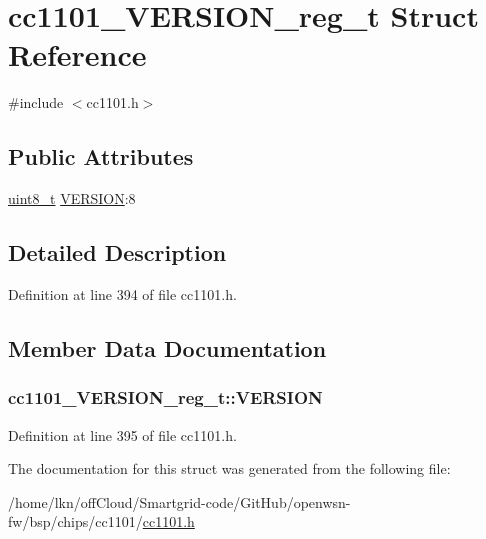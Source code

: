 \hypertarget{structcc1101___v_e_r_s_i_o_n__reg__t}{}\section{cc1101\+\_\+\+V\+E\+R\+S\+I\+O\+N\+\_\+reg\+\_\+t Struct Reference}
\label{structcc1101___v_e_r_s_i_o_n__reg__t}


{\ttfamily \#include $<$cc1101.\+h$>$}

\subsection*{Public Attributes}
\begin{DoxyCompactItemize}
\item 
\hyperlink{_p_e___types_8h_aba7bc1797add20fe3efdf37ced1182c5}{uint8\+\_\+t} \hyperlink{structcc1101___v_e_r_s_i_o_n__reg__t_a79ddae599fc33769e9c439d73ef1a0eb}{V\+E\+R\+S\+I\+ON}\+:8
\end{DoxyCompactItemize}


\subsection{Detailed Description}


Definition at line 394 of file cc1101.\+h.



\subsection{Member Data Documentation}
\subsubsection[{\texorpdfstring{V\+E\+R\+S\+I\+ON}{VERSION}}]{ cc1101\+\_\+\+V\+E\+R\+S\+I\+O\+N\+\_\+reg\+\_\+t\+::\+V\+E\+R\+S\+I\+ON}\hypertarget{structcc1101___v_e_r_s_i_o_n__reg__t_a79ddae599fc33769e9c439d73ef1a0eb}{}\label{structcc1101___v_e_r_s_i_o_n__reg__t_a79ddae599fc33769e9c439d73ef1a0eb}


Definition at line 395 of file cc1101.\+h.



The documentation for this struct was generated from the following file\+:\begin{DoxyCompactItemize}
\item 
/home/lkn/off\+Cloud/\+Smartgrid-\/code/\+Git\+Hub/openwsn-\/fw/bsp/chips/cc1101/\hyperlink{cc1101_8h}{cc1101.\+h}\end{DoxyCompactItemize}
